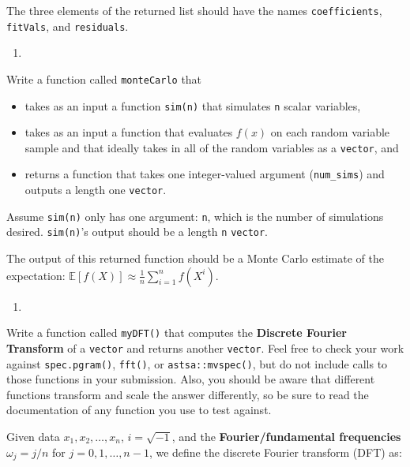 \documentclass[
  12pt,
  krantz2]{krantz}
\providecommand{\tightlist}{%
  \setlength{\itemsep}{0pt}\setlength{\parskip}{0pt}}
\begin{document}
The three elements of the returned list should have the names \texttt{coefficients}, \texttt{fitVals}, and \texttt{residuals}.

\begin{enumerate}
\def\labelenumi{\arabic{enumi}.}
\setcounter{enumi}{1}
\tightlist
\item
\end{enumerate}

Write a function called \texttt{monteCarlo} that

\begin{itemize}
\tightlist
\item
  takes as an input a function \texttt{sim(n)} that simulates \texttt{n} scalar variables,\\
\item
  takes as an input a function that evaluates \(f(x)\) on each random variable sample and that ideally takes in all of the random variables as a \texttt{vector}, and
\item
  returns a function that takes one integer-valued argument (\texttt{num\_sims}) and outputs a length one \texttt{vector}.
\end{itemize}

Assume \texttt{sim(n)} only has one argument: \texttt{n}, which is the number of simulations desired. \texttt{sim(n)}'s output should be a length \texttt{n} \texttt{vector}.

The output of this returned function should be a Monte Carlo estimate of the expectation: \(\mathbb{E}[f(X)] \approx \frac{1}{n}\sum_{i=1}^n f(X^i)\).

\begin{enumerate}
\def\labelenumi{\arabic{enumi}.}
\setcounter{enumi}{2}
\tightlist
\item
\end{enumerate}

Write a function called \texttt{myDFT()} that computes the \textbf{Discrete Fourier Transform} of a \texttt{vector} and returns another \texttt{vector}. Feel free to check your work against \texttt{spec.pgram()}, \texttt{fft()}, or \texttt{astsa::mvspec()}, but do not include calls to those functions in your submission. Also, you should be aware that different functions transform and scale the answer differently, so be sure to read the documentation of any function you use to test against.

Given data \(x_1,x_2,\ldots,x_n\), \(i = \sqrt{-1}\), and the \textbf{Fourier/fundamental frequencies} \(\omega_j= j/n\) for \(j=0,1,\ldots,n-1\), we define the discrete Fourier transform (DFT) as:
\end{document}
